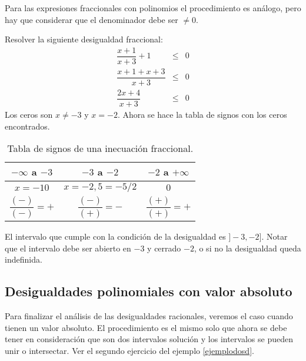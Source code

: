 Para las expresiones fraccionales con polinomios el procedimiento es análogo, pero hay que considerar que el denominador debe ser $\neq 0$.\\

\begin{myexample}
Resolver la siguiente desigualdad fraccional:\\
\begin{eqnarray}
\dfrac{x+1}{x+3}+1&\leq &0 \\
\dfrac{x+1+x+3}{x+3} &\leq &0 \\
\dfrac{2x+4}{x+3}& \leq & 0 
\end{eqnarray} 
Los ceros son $x\neq-3$ y $x=-2$. Ahora se hace la tabla de signos con los ceros encontrados.\\
\begin{center}
\begin{table}[h!]
\centering
\begin{tabular}{|c|c|c|}
\hline
$-\infty$ a $-3$&$-3$ a $-2$& $-2$ a $+\infty$ \\
\hline
$x=-10$&$x=-2,5=-5/2$&$0$ \\
$\dfrac{(-)}{(-)}=+$&$\dfrac{(-)}{(+)}=-$&$\dfrac{(+)}{(+)}=+$ \\
\hline 
\end{tabular}
\caption[Tabla de signos de una inecuación fraccional.]{Tabla de signos de una inecuación fraccional.}
\end{table}
\end{center}
El intervalo que cumple con la condición de la desigualdad es $]-3,-2]$. Notar que el intervalo debe ser abierto en $-3$ y cerrado $-2$, o si no la desigualdad queda indefinida.
\end{myexample}

\subsection{Desigualdades polinomiales con valor absoluto}
Para finalizar el análisis de las desigualdades racionales, veremos el caso cuando tienen un valor absoluto. El procedimiento es el mismo solo que ahora se debe tener en consideración que son dos intervalos solución y los intervalos se pueden unir o intersectar. Ver el segundo ejercicio del ejemplo \ref{ejemplodosd}.

